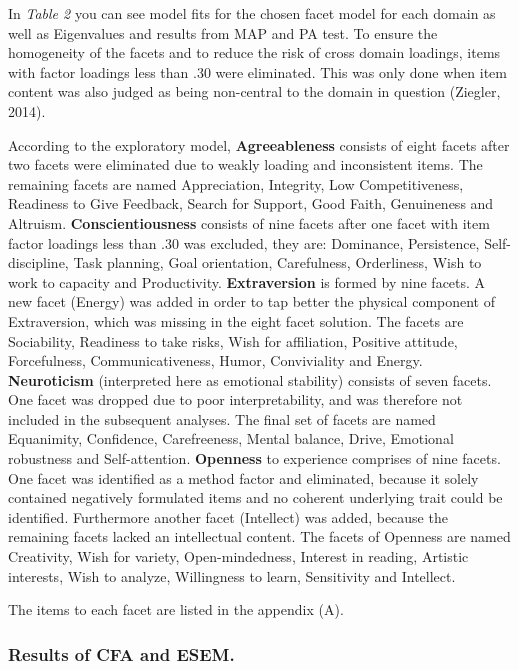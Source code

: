 \documentclass[,man,floatsintext]{apa6}
\theoremstyle{definition}
\theoremstyle{definition}
\theoremstyle{definition}
\theoremstyle{remark}
\begin{document}
In \emph{Table 2} you can see model fits for the chosen facet model for
each domain as well as Eigenvalues and results from MAP and PA test. To
ensure the homogeneity of the facets and to reduce the risk of cross
domain loadings, items with factor loadings less than .30 were
eliminated. This was only done when item content was also judged as
being non-central to the domain in question (Ziegler, 2014).

According to the exploratory model, \textbf{Agreeableness} consists of
eight facets after two facets were eliminated due to weakly loading and
inconsistent items. The remaining facets are named Appreciation,
Integrity, Low Competitiveness, Readiness to Give Feedback, Search for
Support, Good Faith, Genuineness and Altruism.
\textbf{Conscientiousness} consists of nine facets after one facet with
item factor loadings less than .30 was excluded, they are: Dominance,
Persistence, Self-discipline, Task planning, Goal orientation,
Carefulness, Orderliness, Wish to work to capacity and Productivity.
\textbf{Extraversion} is formed by nine facets. A new facet (Energy) was
added in order to tap better the physical component of Extraversion,
which was missing in the eight facet solution. The facets are
Sociability, Readiness to take risks, Wish for affiliation, Positive
attitude, Forcefulness, Communicativeness, Humor, Conviviality and
Energy. \textbf{Neuroticism} (interpreted here as emotional stability)
consists of seven facets. One facet was dropped due to poor
interpretability, and was therefore not included in the subsequent
analyses. The final set of facets are named Equanimity, Confidence,
Carefreeness, Mental balance, Drive, Emotional robustness and
Self-attention. \textbf{Openness} to experience comprises of nine
facets. One facet was identified as a method factor and eliminated,
because it solely contained negatively formulated items and no coherent
underlying trait could be identified. Furthermore another facet
(Intellect) was added, because the remaining facets lacked an
intellectual content. The facets of Openness are named Creativity, Wish
for variety, Open-mindedness, Interest in reading, Artistic interests,
Wish to analyze, Willingness to learn, Sensitivity and Intellect.

The items to each facet are listed in the appendix (A).

\hypertarget{results-of-cfa-and-esem.}{%
\subsubsection{Results of CFA and
ESEM.}\label{results-of-cfa-and-esem.}}
\end{document}

